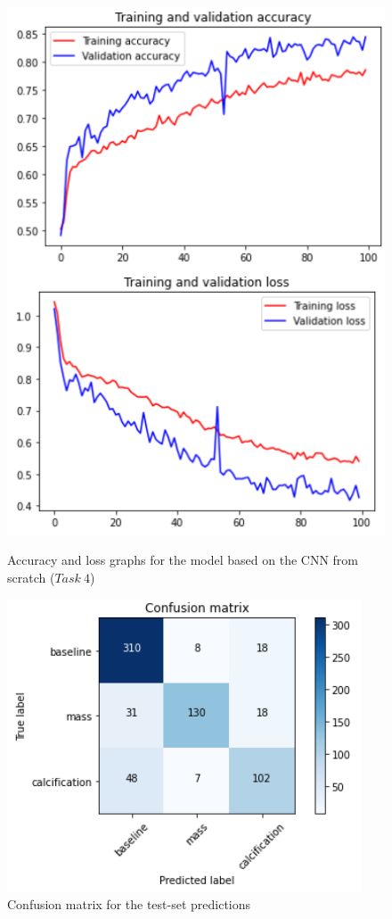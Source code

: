 \documentclass[11pt,a4paper,oneside]{article}
\begin{document}
\begin{figure}[h]
\centering
	\begin{minipage}[c]{.4\textwidth}
		\centering\setlength{\captionmargin}{0pt}%
		\includegraphics[width=.9\textwidth]{images/4.1/1_acc}
		\caption{Accuracy and loss graphs for the model based on the CNN from scratch ($Task\ 4$)}
		\label{fig:4_acc}
	\end{minipage}
	\hspace{5mm}%
	\begin{minipage}[c]{.4\textwidth}
		\centering\setlength{\captionmargin}{0pt}%
		\includegraphics[width=.9\textwidth]{images/4.1/1_matrix}
		\caption{Confusion matrix for the test-set predictions}
		\label{fig:4_matrix}
	\end{minipage}%
\end{figure}
\end{document}
